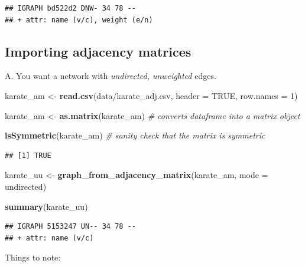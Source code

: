 \documentclass[
]{book}
\newenvironment{Shaded}{\begin{snugshade}}{\end{snugshade}}
\newcommand{\AttributeTok}[1]{\textcolor[rgb]{0.13,0.29,0.53}{#1}}
\newcommand{\CommentTok}[1]{\textcolor[rgb]{0.56,0.35,0.01}{\textit{#1}}}
\newcommand{\ConstantTok}[1]{\textcolor[rgb]{0.56,0.35,0.01}{#1}}
\newcommand{\DecValTok}[1]{\textcolor[rgb]{0.00,0.00,0.81}{#1}}
\newcommand{\FunctionTok}[1]{\textcolor[rgb]{0.13,0.29,0.53}{\textbf{#1}}}
\newcommand{\NormalTok}[1]{#1}
\newcommand{\OtherTok}[1]{\textcolor[rgb]{0.56,0.35,0.01}{#1}}
\newcommand{\StringTok}[1]{\textcolor[rgb]{0.31,0.60,0.02}{#1}}
\begin{document}
\begin{verbatim}
## IGRAPH bd522d2 DNW- 34 78 -- 
## + attr: name (v/c), weight (e/n)
\end{verbatim}

\subsection{Importing adjacency matrices}\label{importing-adjacency-matrices}

A. You want a network with \emph{undirected, unweighted} edges.

\begin{Shaded}
\begin{Highlighting}[]
\NormalTok{karate\_am }\OtherTok{\textless{}{-}} \FunctionTok{read.csv}\NormalTok{(}\StringTok{\textquotesingle{}data/karate\_adj.csv\textquotesingle{}}\NormalTok{, }\AttributeTok{header =} \ConstantTok{TRUE}\NormalTok{, }\AttributeTok{row.names =} \DecValTok{1}\NormalTok{)}

\NormalTok{karate\_am }\OtherTok{\textless{}{-}} \FunctionTok{as.matrix}\NormalTok{(karate\_am) }\CommentTok{\# converts dataframe into a matrix object}

\FunctionTok{isSymmetric}\NormalTok{(karate\_am) }\CommentTok{\# sanity check that the matrix is symmetric }
\end{Highlighting}
\end{Shaded}

\begin{verbatim}
## [1] TRUE
\end{verbatim}

\begin{Shaded}
\begin{Highlighting}[]
\NormalTok{karate\_uu }\OtherTok{\textless{}{-}} \FunctionTok{graph\_from\_adjacency\_matrix}\NormalTok{(karate\_am, }\AttributeTok{mode =} \StringTok{\textquotesingle{}undirected\textquotesingle{}}\NormalTok{)}

\FunctionTok{summary}\NormalTok{(karate\_uu)}
\end{Highlighting}
\end{Shaded}

\begin{verbatim}
## IGRAPH 5153247 UN-- 34 78 -- 
## + attr: name (v/c)
\end{verbatim}

Things to note:
\end{document}
